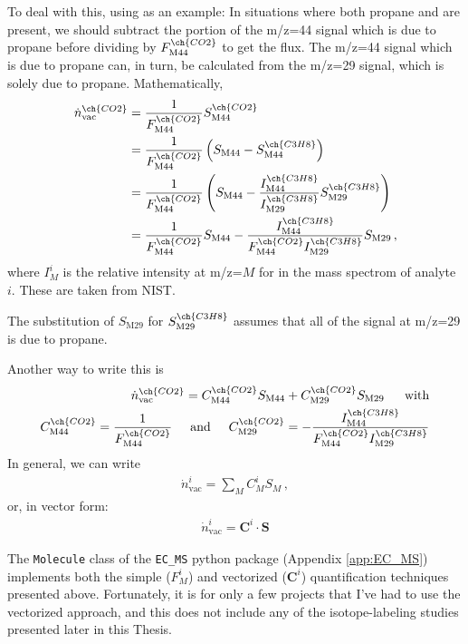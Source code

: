 To deal with this, using  as an example: In situations where both propane and  are present, we should subtract the portion of the m/z=44 signal which is due to propane before dividing by $F_\text{M44}^{\ch{CO2}}$ to get the  flux. The m/z=44 signal which is due to propane can, in turn, be calculated from the m/z=29 signal, which is solely due to propane. Mathematically,
\begin{align}
\dot{n}^{\ch{CO2}}_{\text{vac}} &= \frac{1}{F^{\ch{CO2}}_\text{M44}}S^{\ch{CO2}}_\text{M44}\\
&= \frac{1}{F^{\ch{CO2}}_\text{M44}}\left(
S_\text{M44} - S^{\ch{C3H8}}_\text{M44}
\right)\\
&= \frac{1}{F^{\ch{CO2}}_\text{M44}}\left(
S_\text{M44} - \frac{I^{\ch{C3H8}}_\text{M44}}{I^{\ch{C3H8}}_\text{M29}}S^{\ch{C3H8}}_\text{M29}
\right)\\
&= \frac{1}{F^{\ch{CO2}}_\text{M44}}S_\text{M44} - \frac{I^{\ch{C3H8}}_\text{M44}}{F^{\ch{CO2}}_\text{M44}I^{\ch{C3H8}}_\text{M29}}S_\text{M29}\,,
\end{align}
where $I_M^i$ is the relative intensity at m/z=$M$ for in the mass spectrom of analyte $i$. These are taken from NIST. 

The substitution of $S_\text{M29}$ for $S^{\ch{C3H8}}_\text{M29}$ assumes that all of the signal at m/z=29 is due to propane.

Another way to write this is 
\begin{align}
\dot{n}^{\ch{CO2}}_{\text{vac}} = C_\text{M44}^{\ch{CO2}} S_\text{M44} + C_\text{M29}^{\ch{CO2}} S_\text{M29}
\,\hspace{5mm}\text{with}\\
C_\text{M44}^{\ch{CO2}} = \frac{1}{F_\text{M44}^{\ch{CO2}}}\hspace{5mm}\text{and}\hspace{5mm} C_\text{M29}^{\ch{CO2}} = - \frac{I^{\ch{C3H8}}_\text{M44}}{F^{\ch{CO2}}_\text{M44}I^{\ch{C3H8}}_\text{M29}}
\end{align} 
In general, we can write 
\begin{align}
\dot{n}^{i}_{\text{vac}} = \sum_M C_M^i S_M\,,
\end{align}
or, in vector form:
\begin{align}
\dot{n}^{i}_{\text{vac}} = \mathbf{C}^i \cdot \mathbf{S}
\end{align}

The \texttt{Molecule} class of the \texttt{EC\_MS} python package (Appendix \ref{app:EC_MS}) implements both the simple ($F_M^i$) and vectorized ($\mathbf{C}^i$) quantification techniques presented above. Fortunately, it is for only a few projects that I've had to use the vectorized approach, and this does not include any of the isotope-labeling studies presented later in this Thesis.


